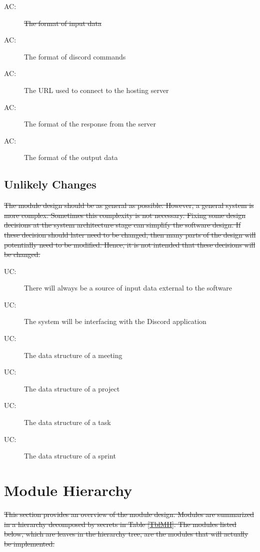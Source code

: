 \documentclass[12pt, titlepage]{article}
\newcounter{acnum}
\newcommand{\actheacnum}{AC\theacnum}
\newcounter{ucnum}
\newcommand{\uctheucnum}{UC\theucnum}
\begin{document}
\begin{description}
\item[ \actheacnum \label{acInput1}:] \sout{The format of input data}
\item[ \actheacnum \label{acInput2}:] The format of discord commands
\item[ \actheacnum \label{acServer1}:] The URL used to connect to the hosting server
\item[ \actheacnum \label{acServer2}:] The format of the response from the server
\item[ \actheacnum \label{acOutput}:] The format of the output data
\end{description}

\subsection{Unlikely Changes} \label{SecUchange}

\sout{The module design should be as general as possible. However, a general system is more complex. Sometimes this complexity is not necessary. Fixing some design decisions at the system architecture stage can simplify the software design. If these decision should later need to be changed, then many parts of the design will potentially need to be modified. Hence, it is not intended that these decisions will be changed.}

\begin{description}
\item[ \uctheucnum \label{ucInput}:] There will always be a source of input data external to the software
\item[ \uctheucnum \label{ucInput}:] The system will be interfacing with the Discord application
\item[ \uctheucnum \label{ucInput}:] The data structure of a meeting
\item[ \uctheucnum \label{ucInput}:] The data structure of a project
\item[ \uctheucnum \label{ucInput}:] The data structure of a task
\item[ \uctheucnum \label{ucInput}:] The data structure of a sprint
\end{description}

\section{Module Hierarchy} \label{SecMH}
\sout{This section provides an overview of the module design. Modules are summarized in a hierarchy decomposed by secrets in Table \ref{TblMH}. The modules listed below, which are leaves in the hierarchy tree, are the modules that will actually be implemented.}
\end{document}
